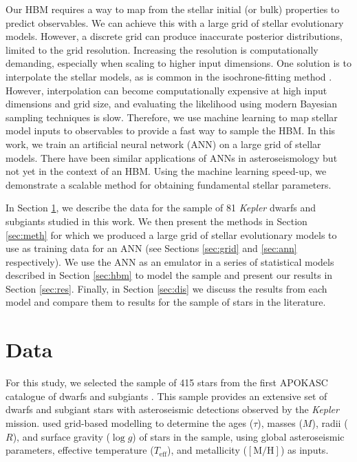 \documentclass[fleqn,usenatbib]{mnras}
\newcommand{\metallicity}{\ensuremath{[\mathrm{M}/\mathrm{H}]}}
\newcommand{\teff}{\ensuremath{T_\mathrm{eff}}}
\begin{document}
Our HBM requires a way to map from the stellar initial (or bulk) properties to predict observables. We can achieve this with a large grid of stellar evolutionary models. However, a discrete grid can produce inaccurate posterior distributions, limited to the grid resolution. Increasing the resolution is computationally demanding, especially when scaling to higher input dimensions. One solution is to interpolate the stellar models, as is common in the isochrone-fitting method \citep[see e.g.][]{Berger.Huber.ea2020}. However, interpolation can become computationally expensive at high input dimensions and grid size, and evaluating the likelihood using modern Bayesian sampling techniques is slow. Therefore, we use machine learning to map stellar model inputs to observables to provide a fast way to sample the HBM. In this work, we train an artificial neural network (ANN) on a large grid of stellar models. There have been similar applications of ANNs in asteroseismology \citep{Verma.Hanasoge.ea2016, Bellinger.Angelou.ea2016, Hon.Stello.ea2017, Hon.Stello.ea2018a, Hendriks.Aerts2019} but not yet in the context of an HBM. Using the machine learning speed-up, we demonstrate a scalable method for obtaining fundamental stellar parameters.

In Section \ref{sec:data}, we describe the data for the sample of 81 \emph{Kepler} dwarfs and subgiants studied in this work. We then present the methods in Section \ref{sec:meth} for which we produced a large grid of stellar evolutionary models to use as training data for an ANN (see Sections \ref{sec:grid} and \ref{sec:ann} respectively). We use the ANN as an emulator in a series of statistical models described in Section \ref{sec:hbm} to model the sample and present our results in Section \ref{sec:res}. Finally, in Section \ref{sec:dis} we discuss the results from each model and compare them to results for the sample of stars in the literature.

\section{Data}\label{sec:data}



For this study, we selected the sample of 415 stars from the first APOKASC catalogue of dwarfs and subgiants \citep[][hereafter ]{Serenelli.Johnson.ea2017}. This sample provides an extensive set of dwarfs and subgiant stars with asteroseismic detections observed by the \emph{Kepler} mission.  used grid-based modelling to determine the ages ($\tau$), masses ($M$), radii ($R$), and surface gravity ($\log g$) of stars in the sample, using global asteroseismic parameters, effective temperature ($\teff$), and metallicity ($\metallicity$) as inputs. 
\end{document}
